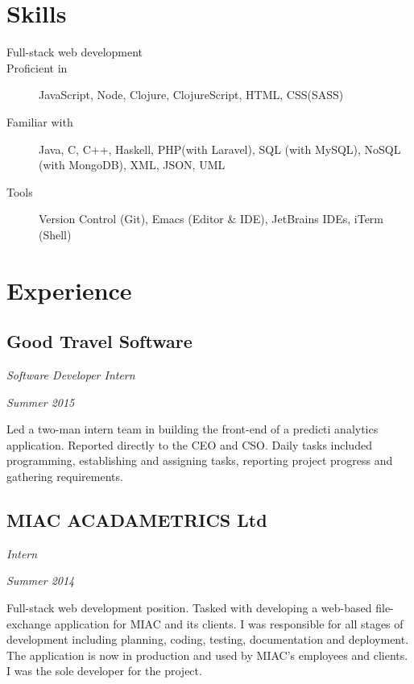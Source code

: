 \section*{Skills}
\begin{description}
  \item[Full-stack web development]
  \item[Proficient in] JavaScript, Node, Clojure, ClojureScript, HTML, CSS(SASS)
  \item[Familiar with] Java, C, C++, Haskell, PHP(with Laravel), SQL (with MySQL), NoSQL (with MongoDB), XML, JSON, UML
  \item[Tools] Version Control (Git), Emacs (Editor \& IDE), JetBrains IDEs, iTerm (Shell)
\end{description}

\section*{Experience}

\subsection*{Good Travel Software}
\begin{minipage}[b]{0.5\textwidth}
  \flushleft
  \emph{Software Developer Intern}
\end{minipage}
\begin{minipage}[b]{0.5\textwidth}
  \flushright
  \emph{Summer 2015}
\end{minipage}
Led a two-man intern team in building the front-end of a predicti analytics application. Reported directly to the CEO and CSO. Daily tasks included programming, establishing and assigning tasks, reporting project progress and gathering requirements.

\subsection*{MIAC ACADAMETRICS Ltd}
\begin{minipage}[b]{0.5\textwidth}
  \flushleft
  \emph{Intern}
\end{minipage}
\begin{minipage}[b]{0.5\textwidth}
  \flushright
  \emph{Summer 2014}
\end{minipage}
Full-stack web development position. Tasked with developing a web-based  file-exchange application for MIAC and its clients. I was responsible for all stages of development including planning, coding, testing, documentation and deployment. The application is now in production and used by MIAC’s employees and clients. I was the sole developer for the project.

